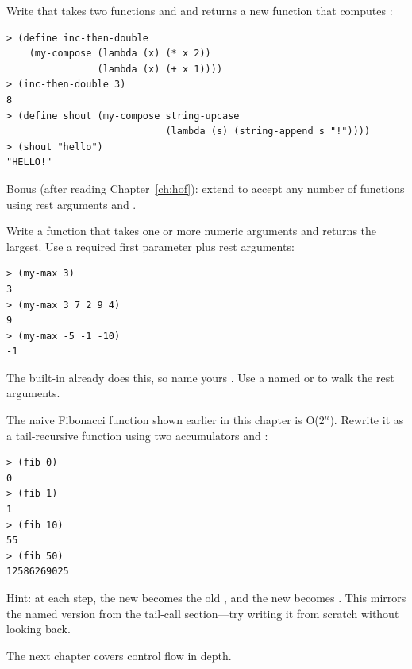 \begin{exercise}
Write  that takes two functions  and  and returns a new function that computes :

\begin{lstlisting}[style=repl]
> (define inc-then-double
    (my-compose (lambda (x) (* x 2))
                (lambda (x) (+ x 1))))
> (inc-then-double 3)
8
> (define shout (my-compose string-upcase
                            (lambda (s) (string-append s "!"))))
> (shout "hello")
"HELLO!"
\end{lstlisting}

Bonus (after reading Chapter~\ref{ch:hof}): extend  to accept any number of functions using rest arguments and .
\end{exercise}

\begin{exercise}
Write a function  that takes one or more numeric arguments and returns the largest. Use a required first parameter plus rest arguments:

\begin{lstlisting}[style=repl]
> (my-max 3)
3
> (my-max 3 7 2 9 4)
9
> (my-max -5 -1 -10)
-1
\end{lstlisting}

The built-in  already does this, so name yours . Use a named  or  to walk the rest arguments.
\end{exercise}

\begin{exercise}
The naive Fibonacci function shown earlier in this chapter is O($2^n$). Rewrite it as a tail-recursive function using two accumulators  and :

\begin{lstlisting}[style=repl]
> (fib 0)
0
> (fib 1)
1
> (fib 10)
55
> (fib 50)
12586269025
\end{lstlisting}

Hint: at each step, the new  becomes the old , and the new  becomes . This mirrors the named  version from the tail-call section---try writing it from scratch without looking back.
\end{exercise}

The next chapter covers control flow in depth.

\chapterend
